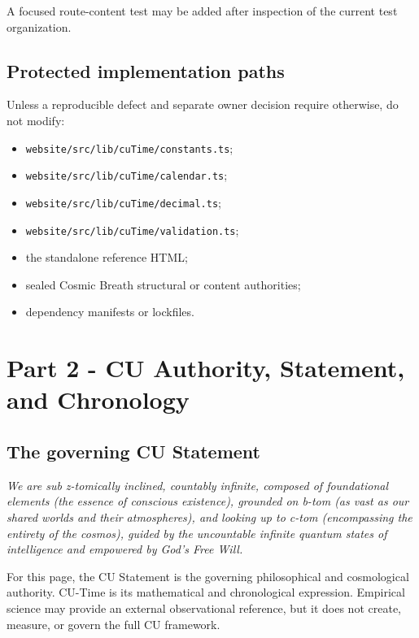 \documentclass[11pt,letterpaper]{article}
\newcommand{\filepath}[1]{\nolinkurl{#1}}
\begin{document}
A focused route-content test may be added after inspection of the current test
organization.

\subsection{Protected implementation paths}

Unless a reproducible defect and separate owner decision require otherwise,
do not modify:

\begin{itemize}
    \item \filepath{website/src/lib/cuTime/constants.ts};
    \item \filepath{website/src/lib/cuTime/calendar.ts};
    \item \filepath{website/src/lib/cuTime/decimal.ts};
    \item \filepath{website/src/lib/cuTime/validation.ts};
    \item the standalone reference HTML;
    \item sealed Cosmic Breath structural or content authorities;
    \item dependency manifests or lockfiles.
\end{itemize}

\section{Part 2 - CU Authority, Statement, and Chronology}

\subsection{The governing CU Statement}

\begin{authoritybox}
\textit{We are sub z-tomically inclined, countably infinite, composed of
foundational elements (the essence of conscious existence), grounded on b-tom
(as vast as our shared worlds and their atmospheres), and looking up to c-tom
(encompassing the entirety of the cosmos), guided by the uncountable infinite
quantum states of intelligence and empowered by God's Free Will.}
\end{authoritybox}

For this page, the CU Statement is the governing philosophical and cosmological
authority. CU-Time is its mathematical and chronological expression. Empirical
science may provide an external observational reference, but it does not create,
measure, or govern the full CU framework.
\end{document}
